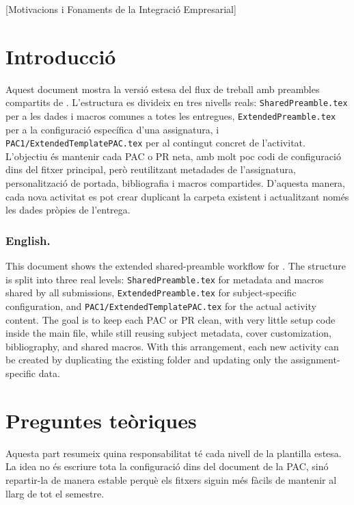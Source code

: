 
[Motivacions i Fonaments de la Integració Empresarial]


	\section*{Introducció}

		Aquest document mostra la versió estesa del flux de treball amb preambles compartits de \PECTeX. L'estructura es divideix en tres nivells reals: \texttt{SharedPreamble.tex} per a les dades i macros comunes a totes les entregues, \texttt{ExtendedPreamble.tex} per a la configuració específica d'una assignatura, i \texttt{PAC1/ExtendedTemplatePAC.tex} per al contingut concret de l'activitat. L'objectiu és mantenir cada PAC o PR neta, amb molt poc codi de configuració dins del fitxer principal, però reutilitzant metadades de l'assignatura, personalització de portada, bibliografia i macros compartides. D'aquesta manera, cada nova activitat es pot crear duplicant la carpeta existent i actualitzant només les dades pròpies de l'entrega.

		\subsubsection*{English.}
	 		This document shows the extended shared-preamble workflow for \PECTeX. The structure is split into three real levels: \texttt{SharedPreamble.tex} for metadata and macros shared by all submissions, \texttt{ExtendedPreamble.tex} for subject-specific configuration, and \texttt{PAC1/ExtendedTemplatePAC.tex} for the actual activity content. The goal is to keep each PAC or PR clean, with very little setup code inside the main file, while still reusing subject metadata, cover customization, bibliography, and shared macros. With this arrangement, each new activity can be created by duplicating the existing folder and updating only the assignment-specific data.


	\newpage
	\section[Part 1]{Preguntes teòriques}

		Aquesta part resumeix quina responsabilitat té cada nivell de la plantilla estesa. La idea no és escriure tota la configuració dins del document de la PAC, sinó repartir-la de manera estable perquè els fitxers siguin més fàcils de mantenir al llarg de tot el semestre.

